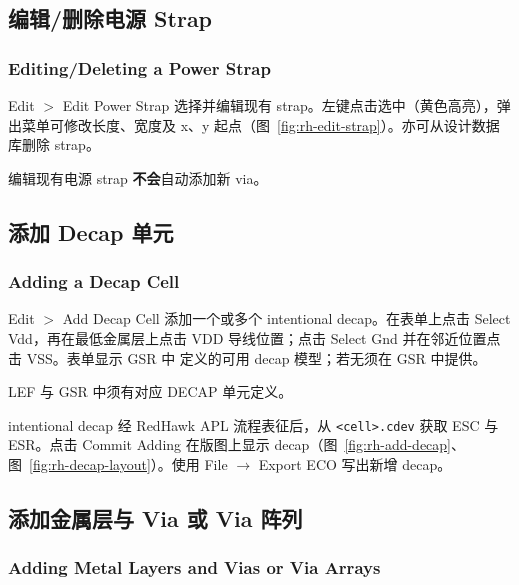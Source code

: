\subsection{编辑/删除电源 Strap}
\subsubsection*{Editing/Deleting a Power Strap}

Edit $>$ Edit Power Strap 选择并编辑现有 strap。左键点击选中（黄色高亮），弹出菜单可修改长度、宽度及 x、y 起点（图~\ref{fig:rh-edit-strap}）。亦可从设计数据库删除 strap。

\begin{noteBox}
编辑现有电源 strap \textbf{不会}自动添加新 via。
\end{noteBox}


\subsection{添加 Decap 单元}
\subsubsection*{Adding a Decap Cell}

Edit $>$ Add Decap Cell 添加一个或多个 intentional decap。在表单上点击 Select Vdd，再在最低金属层上点击 VDD 导线位置；点击 Select Gnd 并在邻近位置点击 VSS。表单显示 GSR 中  定义的可用 decap 模型；若无须在 GSR 中提供。

\begin{noteBox}
LEF 与 GSR 中须有对应 DECAP 单元定义。
\end{noteBox}

intentional decap 经 RedHawk APL 流程表征后，从 \texttt{<cell>.cdev} 获取 ESC 与 ESR。点击 Commit Adding 在版图上显示 decap（图~\ref{fig:rh-add-decap}、图~\ref{fig:rh-decap-layout}）。使用 File $\rightarrow$ Export ECO 写出新增 decap。



\subsection{添加金属层与 Via 或 Via 阵列}
\subsubsection*{Adding Metal Layers and Vias or Via Arrays}

